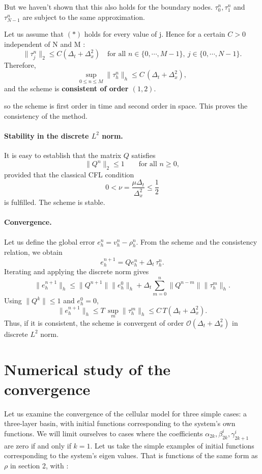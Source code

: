 \documentclass{article}
\begin{document}
But we haven't shown that this also holds for the boundary nodes. $\tau_0^n, \tau_1^n$ and $\tau_{N-1}^n$ are subject to the same approximation.

Let us assume that $(*)$ holds for every value of j. 
Hence for a certain $C>0$ independent of N and M :
\[
\|\tau_j^n\|_2 \leq C(\Delta_t + \Delta_x^2)
\quad \text{for all } n \in \{0, \cdots, M-1\}, \ j \in \{0,\cdots,N-1\}.
\]
Therefore,
\[
\sup_{0 \le n \le M}\|\tau_h^n\|_h \le C\,(\Delta_t + \Delta_x^2),
\]
and the scheme is \textbf{consistent of order $(1,2)$}.


so the scheme is first order in time and second order in space.  
This proves the consistency of the method.

\paragraph{Stability in the discrete $L^2$ norm.}
It is easy to establish that the matrix $Q$ satisfies
\[
\|Q^n\|_2\le 1
\qquad \text{for all } n \ge 0,
\]
provided that the classical CFL condition
\begin{equation}\label{eq:cfl}
0 < \nu = \frac{\mu \Delta_t}{\Delta_x^2} \le \frac{1}{2}
\end{equation}
is fulfilled.
The scheme is stable.


\paragraph{Convergence.}

Let us define the global error $e_h^n = v_h^n - \rho_h^n$.  
From the scheme and the consistency relation, we obtain
\[
e_h^{n+1} = Q e_h^n + \Delta_t\,\tau_h^n.
\]
Iterating and applying the discrete norm gives
\[
\|e_h^{n+1}\|_h \le \|Q^{n+1}\|\|e_h^0\|_h 
      + \Delta_t \sum_{m=0}^{n}\|Q^{n-m}\|\|\tau_h^m\|_h.
\]
Using $\|Q^k\|\le1$ and $e_h^0=0$,
\[
\|e_h^{n+1}\|_h \le T\,\sup_m \|\tau_h^m\|_h
       \le C\,T(\Delta_t + \Delta_x^2).
\]
Thus, if it is consistent, the scheme is convergent of order $\mathcal{O}(\Delta_t + \Delta_x^2)$ in discrete $L^2$ norm.


\section{Numerical study of the convergence}
Let us examine the convergence of the cellular model for three simple
cases: a three-layer basin, with initial functions corresponding to the
system's own functions. We will limit ourselves to cases where 
the coefficients $\alpha_{2k}, \beta_{2k}^i, \gamma_{2k+1}^i$ are zero if and only if
$k = 1$.
Let us take the simple examples of initial functions corresponding to the system's eigen values.
That is functions of the same form as $\rho$ in section 2, with :
\end{document}
